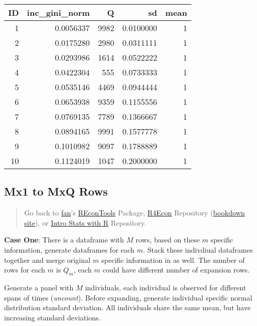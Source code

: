 \documentclass[
]{book}
\begin{document}
\begin{table}[!h]
\centering
\begin{tabular}{r|r|r|r|r}
\hline
ID & inc\_gini\_norm & Q & sd & mean\\
\hline
\rowcolor{gray!6}  1 & 0.0056337 & 9982 & 0.0100000 & 1\\
\hline
2 & 0.0175280 & 2980 & 0.0311111 & 1\\
\hline
\rowcolor{gray!6}  3 & 0.0293986 & 1614 & 0.0522222 & 1\\
\hline
4 & 0.0422304 & 555 & 0.0733333 & 1\\
\hline
\rowcolor{gray!6}  5 & 0.0535146 & 4469 & 0.0944444 & 1\\
\hline
6 & 0.0653938 & 9359 & 0.1155556 & 1\\
\hline
\rowcolor{gray!6}  7 & 0.0769135 & 7789 & 0.1366667 & 1\\
\hline
8 & 0.0894165 & 9991 & 0.1577778 & 1\\
\hline
\rowcolor{gray!6}  9 & 0.1010982 & 9097 & 0.1788889 & 1\\
\hline
10 & 0.1124019 & 1047 & 0.2000000 & 1\\
\hline
\end{tabular}
\end{table}

\hypertarget{mx1-to-mxq-rows}{%
\subsection{Mx1 to MxQ Rows}\label{mx1-to-mxq-rows}}

\begin{quote}
Go back to \href{http://fanwangecon.github.io/}{fan}'s \href{https://fanwangecon.github.io/REconTools/}{REconTools} Package, \href{https://fanwangecon.github.io/R4Econ/}{R4Econ} Repository (\href{https://fanwangecon.github.io/R4Econ/bookdown}{bookdown site}), or \href{https://fanwangecon.github.io/Stat4Econ/}{Intro Stats with R} Repository.
\end{quote}

\textbf{Case One}: There is a dataframe with \(M\) rows, based on these \(m\) specific information, generate dataframes for each \(m\). Stack these indivdiual dataframes together and merge original \(m\) specific information in as well. The number of rows for each \(m\) is \(Q_m\), each \(m\) could have different number of expansion rows.

Generate a panel with \(M\) individuals, each individual is observed for different spans of times (\emph{uncount}). Before expanding, generate individual specific normal distribution standard deviation. All individuals share the same mean, but have increasing standard deviations.
\end{document}
